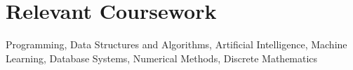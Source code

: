 \documentclass[10pt, letterpaper]{article}
\newenvironment{highlights}{
    \begin{itemize}[
        topsep=0.10 cm,
        parsep=0.10 cm,
        partopsep=0pt,
        itemsep=0pt,
        leftmargin=0 cm + 10pt
    ]
}{
    \end{itemize}
} %
\newenvironment{onecolentry}{
    \begin{adjustwidth}{
        0 cm + 0.00001 cm
    }{
        0 cm + 0.00001 cm
    }
}{
    \end{adjustwidth}
} %
\newenvironment{twocolentry}[2][]{
    \onecolentry
    \def\secondColumn{#2}
    \setcolumnwidth{\fill, 4.5 cm}
    \begin{paracol}{2}
}{
    \switchcolumn \raggedleft \secondColumn
    \end{paracol}
    \endonecolentry
} %
\begin{document}
        \vspace{0.2 cm}


        
        

\section{Relevant Coursework}
Programming, Data Structures and Algorithms, Artificial Intelligence, Machine Learning, Database Systems, Numerical Methods, Discrete Mathematics
\end{document}
